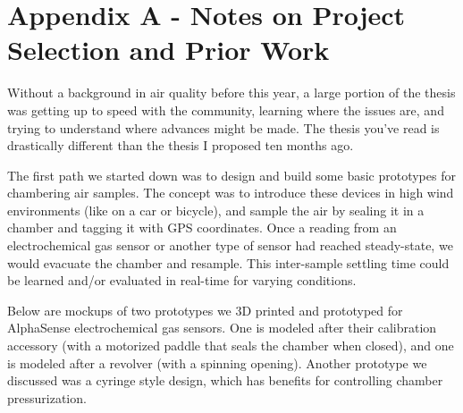\chapter{Appendix A - Notes on Project Selection and Prior Work}

Without a background in air quality before this year, a large portion of the thesis was getting up to speed with the community, learning where the issues are, and trying to understand where advances might be made.  The thesis you've read is drastically different than the thesis I proposed ten months ago.

The first path we started down was to design and build some basic prototypes for chambering air samples.  The concept was to introduce these devices in high wind environments (like on a car or bicycle), and sample the air by sealing it in a chamber and tagging it with GPS coordinates.  Once a reading from an electrochemical gas sensor or another type of sensor had reached steady-state, we would evacuate the chamber and resample.  This inter-sample settling time could be learned and/or evaluated in real-time for varying conditions.

Below are mockups of two prototypes we 3D printed and prototyped for AlphaSense electrochemical gas sensors.  One is modeled after their calibration accessory (with a motorized paddle that seals the chamber when closed), and one is modeled after a revolver (with a spinning opening).  Another prototype we discussed was a cyringe style design, which has benefits for controlling chamber pressurization.
 
